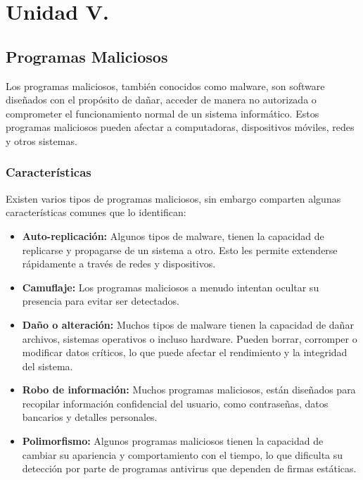\chapter{Unidad V.}
\section{
	Programas Maliciosos
}
Los programas maliciosos, también conocidos como malware, son software diseñados con el propósito de dañar, acceder de manera no autorizada o comprometer el funcionamiento normal de un sistema informático. Estos programas maliciosos pueden afectar a computadoras, dispositivos móviles, redes y otros sistemas. 
\subsection{Características}
Existen varios tipos de programas maliciosos, sin embargo comparten algunas características comunes que lo identifican:

\begin{tcolorbox}[title= Características de los programas maliciosos]
	\begin{itemize}
		
		
		\item \textbf{Auto-replicación:}
		Algunos tipos de malware, tienen la capacidad de replicarse y propagarse de un sistema a otro. Esto les permite extenderse rápidamente a través de redes y dispositivos.
		\item \textbf{Camuflaje:}
		Los programas maliciosos a menudo intentan ocultar su presencia para evitar ser detectados. 
		\item \textbf{Daño o alteración:}
		Muchos tipos de malware tienen la capacidad de dañar archivos, sistemas operativos o incluso hardware. Pueden borrar, corromper o modificar datos críticos, lo que puede afectar el rendimiento y la integridad del sistema.
		\item \textbf{Robo de información:}
		Muchos programas maliciosos, están diseñados para recopilar información confidencial del usuario, como contraseñas, datos bancarios y detalles personales.
		\item \textbf{Polimorfismo:}
		Algunos programas maliciosos tienen la capacidad de cambiar su apariencia y comportamiento con el tiempo, lo que dificulta su detección por parte de programas antivirus que dependen de firmas estáticas.
		
	\end{itemize}
\end{tcolorbox}
